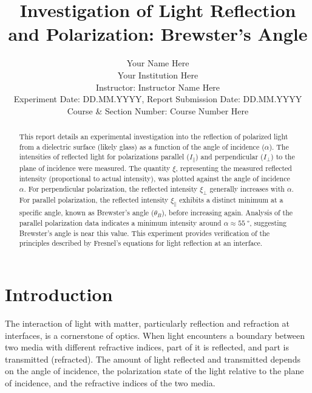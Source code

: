 \documentclass[journal]{IEEEtran}
\begin{document}
\title{Investigation of Light Reflection and Polarization: Brewster's Angle}
\author{Your Name Here \\ %
Your Institution Here \\ %
Instructor: Instructor Name Here \\ %
Experiment Date: DD.MM.YYYY, Report Submission Date: DD.MM.YYYY\\ %
Course \& Section Number: Course Number Here} %


\maketitle

\begin{abstract}
    This report details an experimental investigation into the reflection of polarized light from a dielectric surface (likely glass) as a function of the angle of incidence ($\alpha$). The intensities of reflected light for polarizations parallel ($I_{\parallel}$) and perpendicular ($I_{\perp}$) to the plane of incidence were measured. The quantity $\xi$, representing the measured reflected intensity (proportional to actual intensity), was plotted against the angle of incidence $\alpha$. For perpendicular polarization, the reflected intensity $\xi_{\perp}$ generally increases with $\alpha$. For parallel polarization, the reflected intensity $\xi_{\parallel}$ exhibits a distinct minimum at a specific angle, known as Brewster's angle ($\theta_B$), before increasing again. Analysis of the parallel polarization data indicates a minimum intensity around $\alpha \approx \SI{55}{\degree}$, suggesting Brewster's angle is near this value. This experiment provides verification of the principles described by Fresnel's equations for light reflection at an interface.
\end{abstract}

\section{Introduction}
The interaction of light with matter, particularly reflection and refraction at interfaces, is a cornerstone of optics. When light encounters a boundary between two media with different refractive indices, part of it is reflected, and part is transmitted (refracted). The amount of light reflected and transmitted depends on the angle of incidence, the polarization state of the light relative to the plane of incidence, and the refractive indices of the two media.
\end{document}
